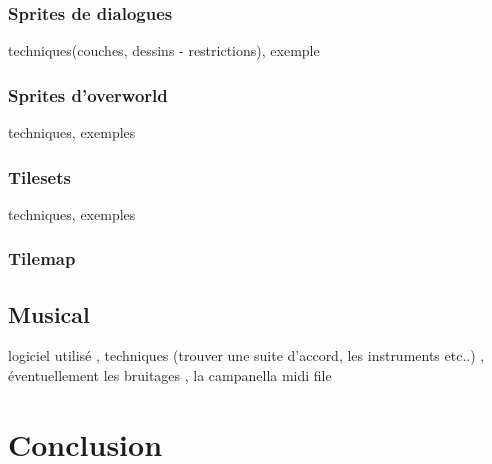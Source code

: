 \documentclass[11pt]{article}
\begin{document}
\subsubsection{Sprites de dialogues}
techniques(couches, dessins - restrictions), exemple 
\subsubsection{Sprites d'overworld}
techniques, exemples
\subsubsection{Tilesets}
techniques, exemples
\subsubsection{Tilemap}
\subsection{Musical}
logiciel utilisé , techniques (trouver une suite d'accord, les instruments etc..) , éventuellement les bruitages , la campanella midi file
\section{Conclusion}
\end{document}
